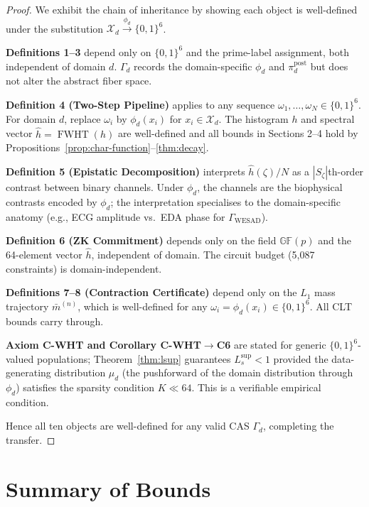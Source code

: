\documentclass[12pt,letterpaper]{article}
\theoremstyle{definition}
\theoremstyle{plain}
\theoremstyle{remark}
\newcommand{\FWHT}{\operatorname{FWHT}}
\newcommand{\hhat}{\hat{h}}
\newcommand{\mbar}{\bar{m}}
\newcommand{\Lsup}{L_s^{\sup}}
\newcommand{\GFp}{\mathbb{GF}(p)}
\begin{document}
\begin{proof}
We exhibit the chain of inheritance by showing each object is well-defined
under the substitution $\mathcal{X}_d \xrightarrow{\phi_d} \{0,1\}^6$.

\textbf{Definitions 1--3} depend only on $\{0,1\}^6$ and the prime-label
assignment, both independent of domain $d$.  $\Gamma_d$ records the
domain-specific $\phi_d$ and $\pi_d^{\mathrm{post}}$ but does not alter
the abstract fiber space.

\textbf{Definition 4 (Two-Step Pipeline)} applies to any sequence
$\omega_1,\ldots,\omega_N \in \{0,1\}^6$.  For domain $d$, replace
$\omega_i$ by $\phi_d(x_i)$ for $x_i \in \mathcal{X}_d$.
The histogram $h$ and spectral vector $\hhat = \FWHT(h)$ are well-defined
and all bounds in Sections 2--4 hold by Propositions~\ref{prop:char-function}--\ref{thm:decay}.

\textbf{Definition 5 (Epistatic Decomposition)} interprets $\hhat(\zeta)/N$
as a $|S_\zeta|$th-order contrast between binary channels.  Under $\phi_d$,
the channels are the biophysical contrasts encoded by $\phi_d$; the
interpretation specialises to the domain-specific anatomy
(e.g., ECG amplitude vs.\ EDA phase for $\Gamma_{\mathrm{WESAD}}$).

\textbf{Definition 6 (ZK Commitment)} depends only on the field $\GFp$
and the 64-element vector $\hhat$, independent of domain.
The circuit budget (5,087 constraints) is domain-independent.

\textbf{Definitions 7--8 (Contraction Certificate)} depend only on the
$L_1$ mass trajectory $\mbar^{(n)}$, which is well-defined for any
$\omega_i = \phi_d(x_i) \in \{0,1\}^6$.  All CLT bounds carry through.

\textbf{Axiom C-WHT and Corollary C-WHT$\to$C6} are stated for generic
$\{0,1\}^6$-valued populations; Theorem~\ref{thm:lsup} guarantees
$\Lsup < 1$ provided the data-generating distribution $\mu_d$
(the pushforward of the domain distribution through $\phi_d$) satisfies
the sparsity condition $K \ll 64$.  This is a verifiable empirical condition.

Hence all ten objects are well-defined for any valid CAS $\Gamma_d$,
completing the transfer.
\end{proof}

\section{Summary of Bounds}
\end{document}
